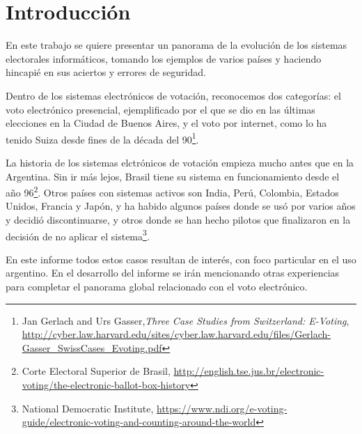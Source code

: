 \documentclass[a4,11pt]{article}
\begin{document}


\maketitle
\pagebreak

\tableofcontents

\pagebreak

\section{Introducción}

En este trabajo se quiere presentar un panorama de la evolución de los sistemas electorales informáticos, tomando los ejemplos de varios países y haciendo hincapié en sus aciertos y errores de seguridad.

Dentro de los sistemas electrónicos de votación, reconocemos dos categorías: el voto electrónico presencial, ejemplificado por el que se dio en las últimas elecciones en la Ciudad de Buenos Aires, y el voto por internet, como lo ha tenido Suiza desde fines de la década del 90\footnote{Jan Gerlach and Urs Gasser,\textit{Three Case Studies from Switzerland: E-Voting}, \url{http://cyber.law.harvard.edu/sites/cyber.law.harvard.edu/files/Gerlach-Gasser_SwissCases_Evoting.pdf}}.

La historia de los sistemas elctrónicos de votación empieza mucho antes que en la Argentina. Sin ir más lejos, Brasil tiene su sistema en funcionamiento desde el año 96\footnote{Corte Electoral Superior de Brasil, \url{http://english.tse.jus.br/electronic-voting/the-electronic-ballot-box-history}}. Otros países con sistemas activos son India, Perú, Colombia, Estados Unidos, Francia y Japón, y ha habido algunos países donde se usó por varios años y decidió discontinuarse, y otros donde se han hecho pilotos que finalizaron en la decisión de no aplicar el sistema\footnote{National Democratic Institute, \url{https://www.ndi.org/e-voting-guide/electronic-voting-and-counting-around-the-world}}.

En este informe todos estos casos resultan de interés, con foco particular en el uso argentino. En el desarrollo del informe se irán mencionando otras experiencias para completar el panorama global relacionado con el voto electrónico.
\end{document}
